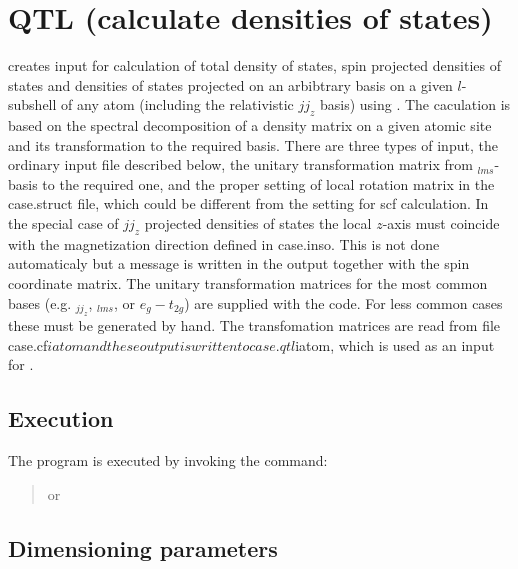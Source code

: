 \section[QTL]{QTL (calculate densities of states)}
\label{sec:qtl}

 creates input for calculation of total density of states,
 spin projected densities of 
states and densities of states projected on an arbibtrary basis on a
given $l$-subshell of any atom (including the relativistic $jj_z$ basis)
using .
The caculation is based on the spectral decomposition of a density matrix
on a given atomic site and its transformation to the required basis.
There are three types of input, the ordinary input file described below, the
unitary transformation matrix from ${}_{lms}$-basis to the required one, and
the proper setting of local rotation matrix in the case.struct file, which 
could be different from the setting for scf calculation. In the special
case of $jj_z$ projected densities of states the local $z$-axis must coincide with 
the magnetization direction defined in case.inso. This is not done automaticaly but
a message is written in the output together with the spin coordinate matrix.
The unitary transformation matrices for the most common bases (e.g. ${}_{jj_z}$, ${}_{lms}$, or
$e_g-t_{2g}$) are supplied with the code. For less common cases these must be generated
by hand. The transfomation matrices are read from file case.cf$iatom and these output
is written to case.qtl$iatom, which is used as an input for .
 


\subsection{Execution}
\label{sec:qtl-exe}

The program  is executed by invoking the command:
\begin{quote}
   or\\
\end{quote}


\subsection{Dimensioning parameters}
\label{sec:qtl-dim}

